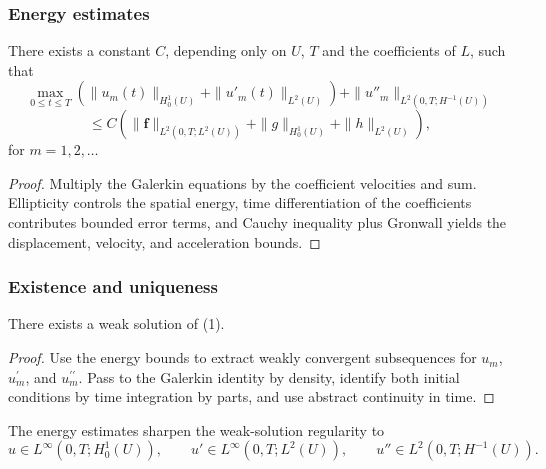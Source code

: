 \subsubsection{Energy estimates}

\begin{theorem}
\label{thm:hyperbolic-energy-estimates}

There exists a constant $C$, depending only on $U$, $T$ and the coefficients of $L$, such that
\[
\max_{0 \le t \le T} \left( \|u_m(t)\|_{H^1_0(U)} + \|u'_m(t)\|_{L^2(U)} \right) + \|u''_m\|_{L^2(0,T;H^{-1}(U))}
\]
\[
\le C \left( \|\mathbf{f}\|_{L^2(0,T;L^2(U))} + \|g\|_{H^1_0(U)} + \|h\|_{L^2(U)} \right),
\tag{19}
\]
for $m = 1, 2, \ldots$
\end{theorem}

\begin{proof}
\sketch Multiply the Galerkin equations by the coefficient velocities and sum. Ellipticity controls the spatial energy, time differentiation of the coefficients contributes bounded error terms, and Cauchy inequality plus Gronwall yields the displacement, velocity, and acceleration bounds.
\end{proof}

\subsubsection{Existence and uniqueness}

\begin{theorem}
\label{thm:hyperbolic-existence-weak-solution}

There exists a weak solution of (1).
\end{theorem}

\begin{proof}
\sketch Use the energy bounds to extract weakly convergent subsequences for $u_m$, $u_m^{\prime}$, and $u_m^{\prime\prime}$. Pass to the Galerkin identity by density, identify both initial conditions by time integration by parts, and use abstract continuity in time.
\end{proof}

\begin{remark}
\label{rem:hyperbolic-existence-remark}

The energy estimates sharpen the weak-solution regularity to
\[
u\in L^\infty(0,T;H_0^1(U)),\qquad
u'\in L^\infty(0,T;L^2(U)),\qquad
u''\in L^2(0,T;H^{-1}(U)).
\]
\end{remark}

